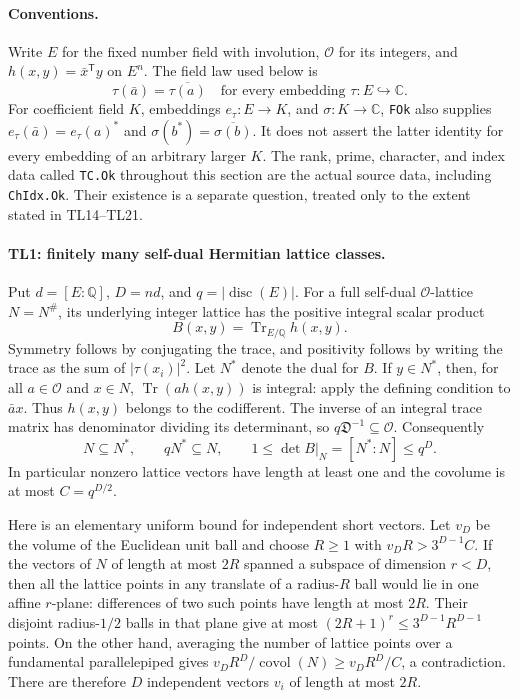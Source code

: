 \documentclass[11pt,a4paper]{article}
\numberwithin{equation}{section}
\theoremstyle{remark}\newtheorem{remark}[theorem]{Remark}
\begin{document}
\paragraph{Conventions.}
Write $E$ for the fixed number field with involution, $\mathcal O$ for
its integers, and $h(x,y)=\bar x^{\mathsf T}y$ on $E^n$. The field law
used below is
\[
 \tau(\bar a)=\overline{\tau(a)}
 \quad\text{for every embedding }\tau:E\hookrightarrow\mathbb C.
 \tag{TL.1}
\]
For coefficient field $K$, embeddings $e_\tau:E\to K$, and
$\sigma:K\to\mathbb C$, \texttt{FOk} also supplies
$e_\tau(\bar a)=e_\tau(a)^*$ and
$\sigma(b^*)=\overline{\sigma(b)}$. It does not assert the latter
identity for every embedding of an arbitrary larger $K$.
The rank, prime, character, and index data called \texttt{TC.Ok}
throughout this section are the actual source data, including
\texttt{ChIdx.Ok}. Their existence is a separate question, treated
only to the extent stated in TL14--TL21.

\paragraph{TL1: finitely many self-dual Hermitian lattice classes.}
Put $d=[E:\mathbb Q]$, $D=nd$, and $q=|\operatorname{disc}(E)|$.
For a full self-dual $\mathcal O$-lattice $N=N^\#$, its underlying
integer lattice has the positive integral scalar product
\[
 B(x,y)=\operatorname{Tr}_{E/\mathbb Q}h(x,y).
 \tag{TL.2}
\]
Symmetry follows by conjugating the trace, and positivity follows by
writing the trace as the sum of $|\tau(x_i)|^2$. Let $N^*$ denote the
dual for $B$. If $y\in N^*$, then, for all $a\in\mathcal O$ and
$x\in N$, $\operatorname{Tr}(a h(x,y))$ is integral: apply the defining
condition to $\bar a x$. Thus $h(x,y)$ belongs to the codifferent.
The inverse of an integral trace matrix has denominator dividing its
determinant, so $q\mathfrak D^{-1}\subseteq\mathcal O$. Consequently
\[
 N\subseteq N^*,\qquad qN^*\subseteq N,\qquad
 1\le\det B|_N=[N^*:N]\le q^D.                 \tag{TL.3}
\]
In particular nonzero lattice vectors have length at least one and the
covolume is at most $C=q^{D/2}$.

Here is an elementary uniform bound for independent short vectors.
Let $v_D$ be the volume of the Euclidean unit ball and choose
$R\ge1$ with $v_D R>3^{D-1}C$. If the vectors of $N$ of length at
most $2R$ spanned a subspace of dimension $r<D$, then all the lattice
points in any translate of a radius-$R$ ball would lie in one affine
$r$-plane: differences of two such points have length at most $2R$.
Their disjoint radius-$1/2$ balls in that plane give at most
$(2R+1)^r\le3^{D-1}R^{D-1}$ points. On the other hand, averaging the
number of lattice points over a fundamental parallelepiped gives
$v_D R^D/\operatorname{covol}(N)\ge v_D R^D/C$, a contradiction.
There are therefore $D$ independent vectors $v_i$ of length at most
$2R$.
\end{document}
